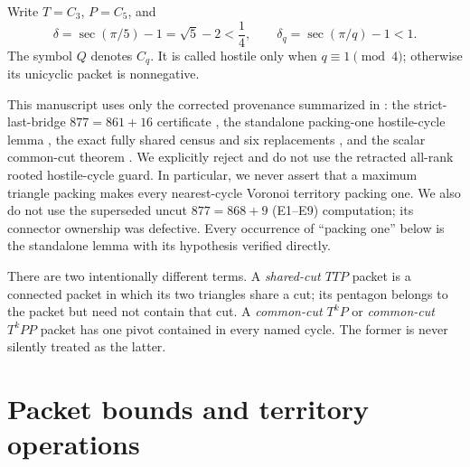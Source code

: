 \documentclass[11pt]{article}
\begin{document}
Write $T=C_3$, $P=C_5$, and
\[
 \delta=\sec(\pi/5)-1=\sqrt5-2<\frac14,
 \qquad \delta_q=\sec(\pi/q)-1<1.
\]
The symbol $Q$ denotes $C_q$.  It is called hostile only when
$q\equiv1\pmod4$; otherwise its unicyclic packet is nonnegative.

This manuscript uses only the corrected provenance summarized in
\cite{Synthesis}: the strict-last-bridge $877=861+16$ certificate
\cite{LastBridge}, the standalone packing-one hostile-cycle lemma
\cite{PackingOne}, the exact fully shared census and six replacements
\cite{SharedCensus,Six}, and the scalar common-cut theorem
\cite{CommonCut}.  We explicitly reject and do not use the retracted all-rank
rooted hostile-cycle guard.  In particular, we never assert that a maximum
triangle packing makes every nearest-cycle Voronoi territory packing one.
We also do not use the superseded uncut $877=868+9$ (E1--E9) computation; its
connector ownership was defective.  Every occurrence of ``packing one'' below
is the standalone lemma with its hypothesis verified directly.

There are two intentionally different terms.  A \emph{shared-cut $TTP$}
packet is a connected packet in which its two triangles share a cut; its
pentagon belongs to the packet but need not contain that cut.  A
\emph{common-cut $T^kP$} or \emph{common-cut $T^kPP$} packet has one pivot
contained in every named cycle.  The former is never silently treated as the
latter.

\section{Packet bounds and territory operations}
\end{document}
